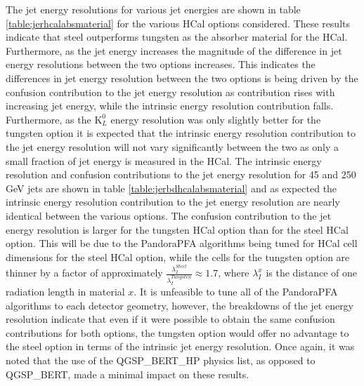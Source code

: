 The jet energy resolutions for various jet energies are shown in table \ref{table:jerhcalabsmaterial} for the various HCal options considered.  These results indicate that steel outperforms tungsten as the absorber material for the HCal.  Furthermore, as the jet energy increases the magnitude of the difference in jet energy resolutions between the two options increases.  This indicates the differences in jet energy resolution between the two options is being driven by the confusion contribution to the jet energy resolution as contribution rises with increasing jet energy, while the intrinsic energy resolution contribution falls.  Furthermore, as the $\text{K}^{0}_{L}$ energy resolution was only slightly better for the tungsten option it is expected that the intrinsic energy resolution contribution to the jet energy resolution will not vary significantly between the two as only a small fraction of jet energy is measured in the HCal.  The intrinsic energy resolution and confusion contributions to the jet energy resolution for 45 and 250 GeV jets are shown in table \ref{table:jerbdhcalabsmaterial} and as expected the intrinsic energy resolution contribution to the jet energy resolution are nearly identical between the various options.  The confusion contribution to the jet energy resolution is larger for the tungsten HCal option than for the steel HCal option.  This will be due to the PandoraPFA algorithms being tuned for HCal cell dimensions for the steel HCal option, while the cells for the tungsten option are thinner by a factor of approximately $\frac{\lambda_{I}^{Steel}}{\lambda_{I}^{Tungsten}} \approx 1.7$, where $\lambda_{I}^{x}$ is the distance of one radiation length in material $x$.  It is unfeasible to tune all of the PandoraPFA algorithms to each detector geometry, however, the breakdowns of the jet energy resolution indicate that even if it were possible to obtain the same confusion contributions for both options, the tungsten option would offer no advantage to the steel option in terms of the intrinsic jet energy resolution.  Once again, it was noted that the use of the QGSP\_BERT\_HP physics list, as opposed to QGSP\_BERT, made a minimal impact on these results.


